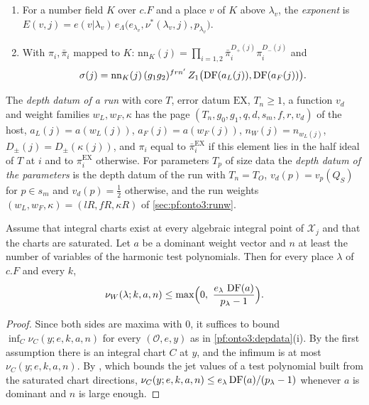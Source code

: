 \begin{definition}
\begin{enumerate}[label=(\roman*)]
\item For a number field $K$ over $c.F$ and a place $v$ of $K$ above $\lambda_v$, the \emph{exponent} is
$E(v,j)=e(v|\lambda_v)\,e_\Lambda\bigl(e_{\lambda_v},\nu^*(\lambda_v,j),p_{\lambda_v}\bigr)$.
\item With $\pi_i,\bar\pi_i$ mapped to $K$: $\mathrm{nn}_K(j)=\prod_{i=1,2}\bar\pi_i^{D_+(j)}\pi_i^{D_-(j)}$ and
\[
\sigma(j)=\mathrm{nn}_K(j)\,(g_1g_2)^{frn'}\,Z_1\bigl(\operatorname{DF}(a_L(j)),\operatorname{DF}(a_F(j))\bigr).
\]
\end{enumerate}
The \emph{depth datum of a run} with core $T$, error datum $\mathrm{EX}$, $T_n\ge1$, a function $v_d$ and weight families
$w_L,w_F,\kappa$ has the page $(T_n,g_0,g_1,q,d,s_m,f,r,v_d)$ of the host, $a_L(j)=a(w_L(j))$, $a_F(j)=a(w_F(j))$,
$n_W(j)=n_{w_L(j)}$, $D_\pm(j)=D_\pm(\kappa(j))$, and $\pi_i$ equal to $\bar\pi_i^{\mathrm{EX}}$ if this element lies in the
half ideal of $T$ at $i$ and to $\pi^{\mathrm{EX}}_i$ otherwise. For parameters $T_p$ of size data the \emph{depth datum of
the parameters} is the depth datum of the run with $T_n=T_O$, $v_d(p)=v_p(Q_S)$ for $p\in s_m$ and $v_d(p)=\frac12$
otherwise, and the run weights $(w_L,w_F,\kappa)=(lR,fR,\kappa R)$ of \cref{sec:pf:onto3:runw}.
\end{definition}

\begin{lemma}\label{pf:onto3:crude}
Assume that integral charts exist at every algebraic integral point of $\mathcal X_j$ and that the charts are
saturated. Let $a$ be a dominant weight vector and $n$ at least the number of variables of the harmonic test
polynomials. Then for every place $\lambda$ of $c.F$ and every $k$,
\[
\nu_W(\lambda;k,a,n)\le\max\Bigl(0,\ \frac{e_\lambda\,\ontothreeDF(a)}{p_\lambda-1}\Bigr).
\]
\end{lemma}

\begin{proof}
Since both sides are maxima with $0$, it suffices to bound $\inf_C\nu_C(y;e,k,a,n)$ for every $(\mathcal O,e,y)$ as in
\cref{pf:onto3:depdata}(i). By the first assumption there is an integral chart $C$ at $y$, and the infimum is at most
$\nu_C(y;e,k,a,n)$. By , which bounds the jet values of a test polynomial built
from the saturated chart directions, $\nu_C(y;e,k,a,n)\le e_\lambda\operatorname{DF}(a)/(p_\lambda-1)$ whenever $a$ is dominant
and $n$ is large enough.
\end{proof}

